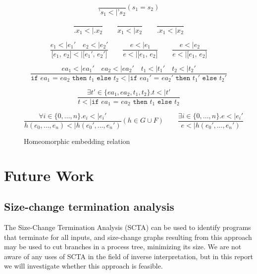 \documentclass[10pt]{../sigplanconf}
\newcommand{\nfrac}[2]{\frac{\displaystyle{#1}}{\displaystyle{#2}}}
\newcommand{\tagsc}[1]{\tag{\scshape #1}}
\begin{document}
\begin{figure}\centering
  \begin{equation}
    \nfrac{
    }{
      \texttt{'}s_1 <| \texttt{'}s_2
    } (s_1 = s_2) \tagsc{Atoms}
  \end{equation}

  \begin{equation}
    \nfrac{
    }{
      \texttt{.}x_1 <| \texttt{.}x_2
    }
    \qquad
    \nfrac{
    }{
      x_1 <| x_2
    }
    \qquad
    \nfrac{
    }{
      \texttt{.}x_1 <| x_2
    } \tagsc{Variables}
  \end{equation}

  \begin{equation}
    \nfrac{
      e_1 <| e_1'\quad e_2 <| e_2'
    }{
      \texttt{[$e_1$, $e_2$]} <| \texttt{[$e_1'$, $e_2'$]}
    }
    \qquad
    \nfrac{
      e <| e_1
    }{
      e <| \texttt{[$e_1$, $e_2$]}
    }
    \qquad
    \nfrac{
      e <| e_2
    }{
      e <| \texttt{[$e_1$, $e_2$]}
    }
    \tagsc{Cons}
  \end{equation}

  \begin{equation}
    \nfrac{
      ea_1 <| ea_1' \quad ea_2 <| ea_2' \quad t_1 <| t_1' \quad t_2 <| t_2'
    }{
      \texttt{if $ea_1$ = $ea_2$ then $t_1$ else $t_2$} <| \texttt{if $ea_1'$ = $ea_2'$ then $t_1'$ else $t_2'$}
    } \tagsc{If-A}
  \end{equation}

  \begin{equation}
    \nfrac{
      \exists t' \in \{ea_1, ea_2, t_1, t_2\}. t <| t'
    }{
      t <| \texttt{if $ea_1$ = $ea_2$ then $t_1$ else $t_2$}
    } \tagsc{If-B}
  \end{equation}

\begin{equation}
  \nfrac{
    \forall i \in \{0, \ldots, n\}. e_i <| e_i'
  }{
    h(e_0, \ldots, e_n) <| h(e_0', \ldots, e_n')
  } (h \in G \cup F)
  \qquad
  \nfrac{
    \exists i \in \{0, \ldots, n\}. e <| e_i'
  }{
    e <| h(e_0', \ldots, e_n')
  }
 \tagsc{Call}
\end{equation}

\caption{Homeomorphic embedding relation}
\label{fig:embedding}
\end{figure}


\section{Future Work}
\subsection{Size-change termination analysis}
  The Size-Change Termination Analysis (SCTA)\cite{lee2001size} can be
  used to identify programs that terminate for all inputs, and
  size-change graphs resulting from this approach may be used to cut
  branches in a process tree, minimizing its size. We are not aware of
  any uses of SCTA in the field of inverse interpretation, but in this
  report we will investigate whether this approach is feasible.
\end{document}
